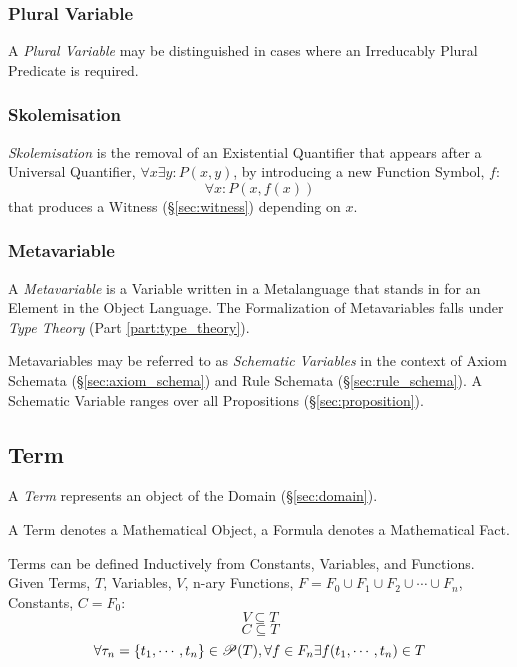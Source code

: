 \subsubsection{Plural Variable}\label{sec:plural_variable}
\cite{laycock10}

A \emph{Plural Variable} may be distinguished in cases where an
Irreducably Plural Predicate is required.



\subsubsection{Skolemisation}\label{sec:skolemisation}

\emph{Skolemisation} is the removal of an Existential Quantifier that
appears after a Universal Quantifier, $\forall x \exists y : P (x,y)$,
by introducing a new Function Symbol, $f$:
\[
  \forall x : P (x, f(x))
\]
that produces a Witness (\S\ref{sec:witness}) depending on $x$.



\subsubsection{Metavariable}\label{sec:metavariable}

A \emph{Metavariable} is a Variable written in a Metalanguage that
stands in for an Element in the Object Language. The Formalization of
Metavariables falls under \emph{Type Theory} (Part
\ref{part:type_theory}).

Metavariables may be referred to as \emph{Schematic Variables} in the
context of Axiom Schemata (\S\ref{sec:axiom_schema}) and Rule Schemata
(\S\ref{sec:rule_schema}). A Schematic Variable ranges over all
Propositions (\S\ref{sec:proposition}).



\subsection{Term}\label{sec:term}

A \emph{Term} represents an object of the Domain (\S\ref{sec:domain}).

A Term denotes a Mathematical Object, a Formula denotes a Mathematical
Fact.

Terms can be defined Inductively from Constants, Variables, and
Functions. Given Terms, $T$, Variables, $V$, n-ary Functions, $F = F_0
\cup F_1 \cup F_2 \cup \cdots \cup F_n$, Constants, $C = F_0$:
\[
  V \subseteq T
\]\[
  C \subseteq T
\]\[
  \forall \tau_n=\{t_1,\cdots,t_n\} \in \mathscr{P}(T), \forall f
  \in F_n \exists f(t_1,\cdots,t_n) \in T
\]



